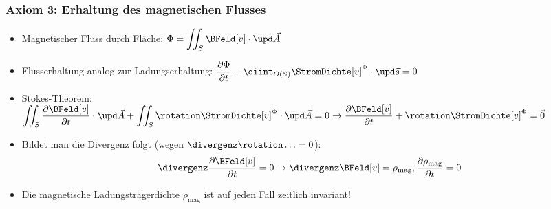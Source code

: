 \begin{frame}
  \frametitle{Axiom 3: Erhaltung des magnetischen Flusses}
\begin{itemize}[<+->]
\item Magnetischer Fluss durch Fläche:
  \(\displaystyle
    \Phi = \iint_S \BFeld[v]\cdot \upd\vec{A}
    \)
\item Flusserhaltung analog zur Ladungserhaltung: \(\displaystyle \dfrac{\partial \Phi}{\partial t} + \oiint_{O(S)} \StromDichte[v]^\Phi \cdot \upd\vec{s} = 0\)

\item Stokes-Theorem: \(\displaystyle \iint_S \frac{\partial \BFeld[v]}{\partial t}\cdot\upd\vec{A} + \iint_{S} \rotation \StromDichte[v]^\Phi \cdot \upd\vec{A} = 0 \to \frac{\partial \BFeld[v]}{\partial t}+ \rotation \StromDichte[v]^\Phi = \vec{0}\)


\item Bildet man die Divergenz folgt (wegen \(\divergenz \rotation \ldots = 0\)):
\begin{equation*}
  \divergenz \frac{\partial \BFeld[v]}{\partial t} = 0 \to \divergenz\BFeld[v] = \rho_\text{mag} , \frac{\partial \rho_\text{mag}}{\partial t}=0
\end{equation*}

\item Die magnetische Ladungsträgerdichte \(\rho_\text{mag} \) ist auf jeden Fall zeitlich invariant! 
\end{itemize}
\end{frame}




